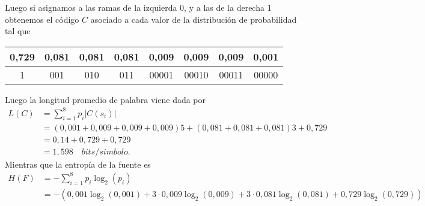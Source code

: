 \begin{sols}
\begin{center}
    \end{center}
Luego si asignamos a las ramas de la izquierda 0, y a las de la derecha 1 obtenemos el código $C$ asociado a cada valor de la distribución de probabilidad tal que
\begin{center}
    \begin{tabular}{|c|c|c|c|c|c|c|c|}
       \hline
        0,729& 0,081& 0,081& 0,081& 0,009& 0,009& 0,009& 0,001\\
        \hline
        1& 001& 010& 011 & 00001 &00010&00011&00000\\
        \hline
    \end{tabular}
\end{center}
Luego la longitud promedio de palabra viene dada por 
\begin{align*}
    L(C)&=\sum_{i=1}^8p_i|C(s_i)|\\
    &=(0,001+0,009+0,009+0,009)5+(0,081+0,081+0,081)3+0,729\\
    &=0,14+0,729+0,729\\
    &=1,598\quad bits/simbolo.
\end{align*}
Mientras que la entropía de la fuente es
\begin{align*}
    H(F)&=-\sum_{i=1}^8p_i\log_2(p_i)\\
    &=-(0,001\log_2(0,001)+3\cdot0,009\log_2(0,009)+3\cdot0,081\log_2(0,081)+0,729\log_2(0,729))
\end{align*}
\end{sols}
